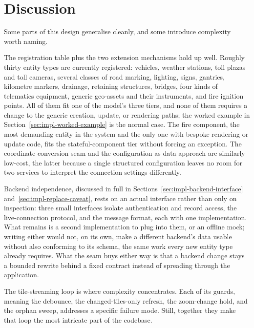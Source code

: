 \section{Discussion}
\label{sec:impl-discussion}

Some parts of this design generalise cleanly, and some introduce complexity worth naming.

The registration table plus the two extension mechanisms hold up well. Roughly thirty entity types are currently registered: vehicles, weather stations, toll plazas and toll cameras, several classes of road marking, lighting, signs, gantries, kilometre markers, drainage, retaining structures, bridges, four kinds of telematics equipment, generic geo-assets and their instruments, and fire ignition points. All of them fit one of the model's three tiers, and none of them requires a change to the generic creation, update, or rendering paths; the worked example in Section~\ref{sec:impl-worked-example} is the normal case. The fire component, the most demanding entity in the system and the only one with bespoke rendering or update code, fits the stateful-component tier without forcing an exception. The coordinate-conversion seam and the configuration-as-data approach are similarly low-cost, the latter because a single structured configuration leaves no room for two services to interpret the connection settings differently.

Backend independence, discussed in full in Sections~\ref{sec:impl-backend-interface} and~\ref{sec:impl-replace-caveat}, rests on an actual interface rather than only on inspection: three small interfaces isolate authentication and record access, the live-connection protocol, and the message format, each with one implementation. What remains is a second implementation to plug into them, or an offline mock; writing either would not, on its own, make a different backend's data usable without also conforming to its schema, the same work every new entity type already requires. What the seam buys either way is that a backend change stays a bounded rewrite behind a fixed contract instead of spreading through the application.

The tile-streaming loop is where complexity concentrates. Each of its guards, meaning the debounce, the changed-tiles-only refresh, the zoom-change hold, and the orphan sweep, addresses a specific failure mode. Still, together they make that loop the most intricate part of the codebase.

